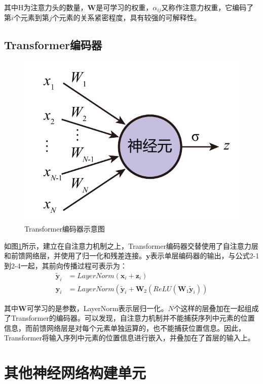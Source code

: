 其中H为注意力头的数量，$\bm{W}$是可学习的权重，$\alpha_{ij}$又称作注意力权重，它编码了第$i$个元素到第$j$个元素的关系紧密程度，具有较强的可解释性。

\subsection{Transformer编码器}

\begin{figure}[]
    \centering
    \includegraphics[page=5]{figure/figures.pdf}
    \caption{Transformer编码器示意图\cite{attn17}}
    \label{trans-enc}
\end{figure}

如图\ref{trans-enc}所示，建立在自注意力机制之上，Transformer编码器交替使用了自注意力层和前馈网络层，并使用了归一化和残差连接。$\bm{y}$表示单层编码器的输出，与公式2-1到2-4一起，其前向传播过程可表示为：
\begin{align}
{\widetilde{\bm{y}}}_i&=LayerNorm\left(\bm{x}_i+\bm{z}_i\right)\\
\bm{y}_i&=LayerNorm\left({\widetilde{\bm{y}}}_i+\bm{W}_2\left(ReLU\left(\bm{W}_1{\widetilde{\bm{y}}}_i\right)\right)\right.
\end{align}

其中$\bm{W}$可学习的是参数，LayerNorm表示层归一化\cite{LayerN16}。$N$个这样的层叠加在一起组成了Transformer的编码器。可以发现，自注意力机制并不能捕获序列中元素的位置信息，而前馈网络层是对每个元素单独运算的，也不能捕获位置信息。因此，Transformer将输入序列中元素的位置信息进行嵌入，并叠加在了首层的输入上。

\section{其他神经网络构建单元}

